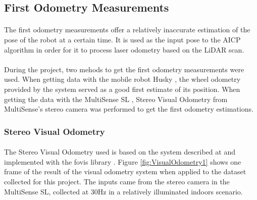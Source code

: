 \documentclass[11pt]{article}
\begin{document}
	\subsection{First Odometry Measurements}
	\paragraph{}
	The first odometry measurements offer a relatively inaccurate estimation of the pose of the robot at a certain time. It is used as the input pose to the AICP algorithm in order for it to process laser odometry based on the LiDAR scan.
	
	\paragraph{}
	During the project, two mehods to get the first odometry measurements were used. When getting data with the mobile robot Husky \cite{Husky}, the wheel odometry provided by the system served as a good first estimate of its position. When getting the data with the MultiSense SL \cite{multisense}, Stereo Visual Odometry from MultiSense's stereo camera was performed to get the first odometry estimations.
	\subsubsection*{Stereo Visual Odometry}
	\paragraph{}
	The Stereo Visual Odometry used is based on the system described at \cite{VisualOdometry} and implemented with the fovis library \cite{fovis}. Figure \ref{fig:VisualOdometry1} shows one frame of the result of the visual odometry system when applied to the dataset collected for this project. The inputs came from the stereo camera in the MultiSense SL, collected at 30Hz in a relatively illuminated indoors scenario.
	
\end{document}
